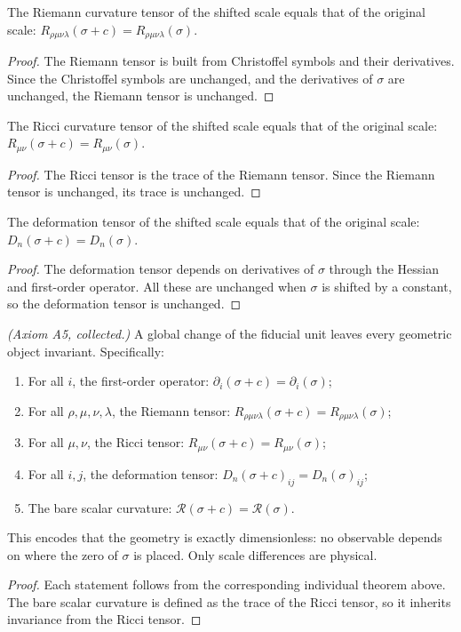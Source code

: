 \begin{theorem}
The Riemann curvature tensor of the shifted scale equals that of the original scale: $R_{\rho\mu\nu\lambda}(\sigma + c) = R_{\rho\mu\nu\lambda}(\sigma)$.
\end{theorem}
\begin{proof}
The Riemann tensor is built from Christoffel symbols and their derivatives. Since the Christoffel symbols are unchanged, and the derivatives of $\sigma$ are unchanged, the Riemann tensor is unchanged.
\end{proof}

\begin{theorem}
The Ricci curvature tensor of the shifted scale equals that of the original scale: $R_{\mu\nu}(\sigma + c) = R_{\mu\nu}(\sigma)$.
\end{theorem}
\begin{proof}
The Ricci tensor is the trace of the Riemann tensor. Since the Riemann tensor is unchanged, its trace is unchanged.
\end{proof}

\begin{theorem}
The deformation tensor of the shifted scale equals that of the original scale: $D_n(\sigma + c) = D_n(\sigma)$.
\end{theorem}
\begin{proof}
The deformation tensor depends on derivatives of $\sigma$ through the Hessian and first-order operator. All these are unchanged when $\sigma$ is shifted by a constant, so the deformation tensor is unchanged.
\end{proof}

\begin{theorem}
\emph{(Axiom A5, collected.)} A global change of the fiducial unit leaves every geometric object invariant. Specifically:
\begin{enumerate}
\item For all $i$, the first-order operator: $\partial_i(\sigma + c) = \partial_i(\sigma)$;
\item For all $\rho, \mu, \nu, \lambda$, the Riemann tensor: $R_{\rho\mu\nu\lambda}(\sigma + c) = R_{\rho\mu\nu\lambda}(\sigma)$;
\item For all $\mu, \nu$, the Ricci tensor: $R_{\mu\nu}(\sigma + c) = R_{\mu\nu}(\sigma)$;
\item For all $i, j$, the deformation tensor: $D_n(\sigma + c)_{ij} = D_n(\sigma)_{ij}$;
\item The bare scalar curvature: $\mathcal{R}(\sigma + c) = \mathcal{R}(\sigma)$.
\end{enumerate}
This encodes that the geometry is exactly dimensionless: no observable depends on where the zero of $\sigma$ is placed. Only scale differences are physical.
\end{theorem}
\begin{proof}
Each statement follows from the corresponding individual theorem above. The bare scalar curvature is defined as the trace of the Ricci tensor, so it inherits invariance from the Ricci tensor.
\end{proof}

